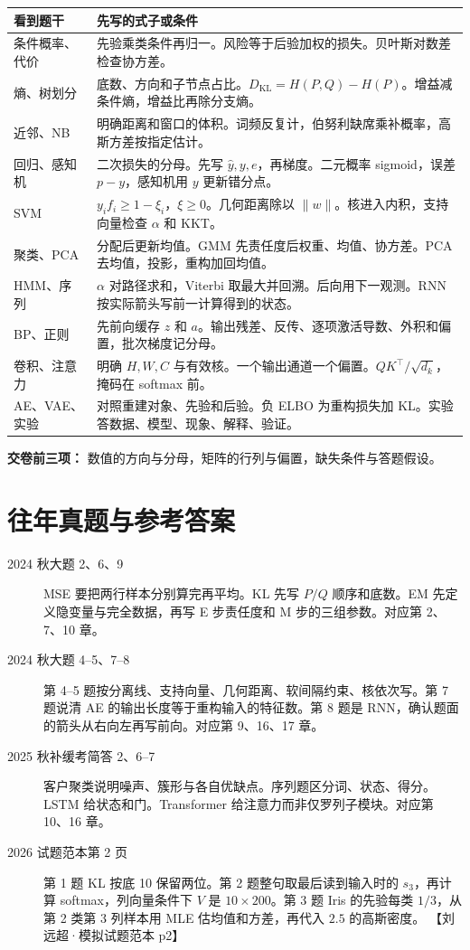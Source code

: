 \documentclass[UTF8,a4paper,zihao=-4,fontset=fandol]{ctexrep}
\begin{document}
\bigskip
\begin{tabularx}{\linewidth}{@{}p{.22\linewidth}X@{}}
\toprule
看到题干 & 先写的式子或条件\\
\midrule
条件概率、代价 & 先验乘类条件再归一。风险等于后验加权的损失。贝叶斯对数差检查协方差。\\[.6em]
熵、树划分 & 底数、方向和子节点占比。$D_{\mathrm{KL}}=H(P,Q)-H(P)$。增益减条件熵，增益比再除分支熵。\\[.6em]
近邻、NB & 明确距离和窗口的体积。词频反复计，伯努利缺席乘补概率，高斯方差按指定估计。\\[.6em]
回归、感知机 & 二次损失的分母。先写 $\hat y,y,e$，再梯度。二元概率 sigmoid，误差 $p-y$，感知机用 $y$ 更新错分点。\\[.6em]
SVM & $y_if_i\ge1-\xi_i$，$\xi\ge0$。几何距离除以 $\|w\|$。核进入内积，支持向量检查 $\alpha$ 和 KKT。\\[.6em]
聚类、PCA & 分配后更新均值。GMM 先责任度后权重、均值、协方差。PCA 去均值，投影，重构加回均值。\\[.6em]
HMM、序列 & $\alpha$ 对路径求和，Viterbi 取最大并回溯。后向用下一观测。RNN 按实际箭头写前一计算得到的状态。\\[.6em]
BP、正则 & 先前向缓存 $z$ 和 $a$。输出残差、反传、逐项激活导数、外积和偏置，批次梯度记分母。\\[.6em]
卷积、注意力 & 明确 $H,W,C$ 与有效核。一个输出通道一个偏置。$QK^\top/\sqrt{d_k}$，掩码在 softmax 前。\\[.6em]
AE、VAE、实验 & 对照重建对象、先验和后验。负 ELBO 为重构损失加 KL。实验答数据、模型、现象、解释、验证。\\
\bottomrule
\end{tabularx}

\bigskip
\noindent\textbf{交卷前三项：} 数值的方向与分母，矩阵的行列与偏置，缺失条件与答题假设。
\clearpage

\section{往年真题与参考答案}
\begin{description}
\item[2024 秋大题 2、6、9] MSE 要把两行样本分别算完再平均。KL 先写 $P/Q$ 顺序和底数。EM 先定义隐变量与完全数据，再写 E 步责任度和 M 步的三组参数。对应第 2、7、10 章。
\item[2024 秋大题 4–5、7–8] 第 4–5 题按分离线、支持向量、几何距离、软间隔约束、核依次写。第 7 题说清 AE 的输出长度等于重构输入的特征数。第 8 题是 RNN，确认题面的箭头从右向左再写前向。对应第 9、16、17 章。
\item[2025 秋补缓考简答 2、6–7] 客户聚类说明噪声、簇形与各自优缺点。序列题区分词、状态、得分。LSTM 给状态和门。Transformer 给注意力而非仅罗列子模块。对应第 10、16 章。
\item[2026 试题范本第 2 页] 第 1 题 KL 按底 10 保留两位。第 2 题整句取最后读到输入时的 $s_3$，再计算 softmax，列向量条件下 $V$ 是 $10\times200$。第 3 题 Iris 的先验每类 $1/3$，从第 2 类第 3 列样本用 MLE 估均值和方差，再代入 $2.5$ 的高斯密度。 【刘远超·模拟试题范本 p2】
\end{description}
\end{document}
